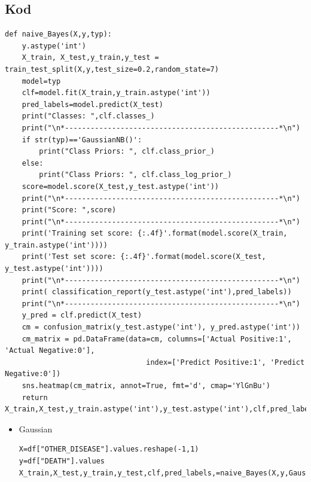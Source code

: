 \documentclass{article}
\begin{document}
{\subsection{Kod}
\begin{lstlisting}
def naive_Bayes(X,y,typ):
    y.astype('int')
    X_train, X_test,y_train,y_test = train_test_split(X,y,test_size=0.2,random_state=7)
    model=typ
    clf=model.fit(X_train,y_train.astype('int'))
    pred_labels=model.predict(X_test)
    print("Classes: ",clf.classes_)
    print("\n*--------------------------------------------------*\n")
    if str(typ)=='GaussianNB()':
        print("Class Priors: ", clf.class_prior_)
    else:
        print("Class Priors: ", clf.class_log_prior_)
    score=model.score(X_test,y_test.astype('int'))
    print("\n*--------------------------------------------------*\n")
    print("Score: ",score)
    print("\n*--------------------------------------------------*\n")
    print('Training set score: {:.4f}'.format(model.score(X_train, y_train.astype('int'))))
    print('Test set score: {:.4f}'.format(model.score(X_test, y_test.astype('int'))))
    print("\n*--------------------------------------------------*\n")
    print( classification_report(y_test.astype('int'),pred_labels))
    print("\n*--------------------------------------------------*\n")
    y_pred = clf.predict(X_test)
    cm = confusion_matrix(y_test.astype('int'), y_pred.astype('int'))
    cm_matrix = pd.DataFrame(data=cm, columns=['Actual Positive:1', 'Actual Negative:0'], 
                                 index=['Predict Positive:1', 'Predict Negative:0'])
    sns.heatmap(cm_matrix, annot=True, fmt='d', cmap='YlGnBu')
    return X_train,X_test,y_train.astype('int'),y_test.astype('int'),clf,pred_labels
\end{lstlisting}
\newpage
\begin{itemize}
    \item Gaussian
    \begin{lstlisting}
X=df["OTHER_DISEASE"].values.reshape(-1,1)
y=df["DEATH"].values
X_train,X_test,y_train,y_test,clf,pred_labels,=naive_Bayes(X,y,GaussianNB())


\end{lstlisting}
\end{itemize}}
\end{document}
